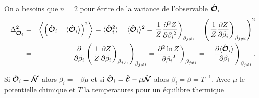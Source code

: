 On a besoins que $n=2$ pour écrire de la variance de l'observable $\hat{\bm{\mathcal{O}}}_i$ 
\begin{eqnarray}
	\Delta_{\hat{\bm{\mathcal{O}}}_i}^2 &=&  	\left \langle \left (\hat{\bm{\mathcal{O}}}_i - \langle\hat{\bm{\mathcal{O}}}_i \rangle \right )^2  \right \rangle  = 	\langle\hat{\bm{\mathcal{O}}}_i^2 \rangle  -  \langle\hat{\bm{\mathcal{O}}}_i \rangle^2 = \left . \frac{1}{Z} \frac{ \partial^2 Z }{ {\partial \beta_i}^2 }  \right )_{\beta_{j\neq i}} - \left ( \left . \frac{1}{Z}\frac{ \partial Z }{ \partial \beta_i }  \right )_{\beta_{j\neq i}}\right )^2  \\
		& = & \frac{\partial}{\partial \beta_i } \left ( \left . \frac{1}{Z} \frac{\partial Z}{\partial \beta_i }  \right )_{\beta_{j\neq i}}  \right )_{\beta_{j\neq i}} =  \left . \frac{\partial^2 \ln Z  }{{\partial \beta_i}^2 }  \right )_{\beta_{j\neq i}}  = - \left . 	\frac{\partial \langle\hat{\bm{\mathcal{O}}}_i \rangle }{\partial \beta_i } \right )_{\beta_{j\neq i}}	.	
\end{eqnarray}

Si $\hat{\bm{\mathcal{O}}}_i = \hat{\bm{\mathcal{N}}}$ alors $\beta_i = - \beta \mu $ et si $\hat{\bm{\mathcal{O}}}_i = \hat{\bm{\mathcal{E}}} - \mu \hat{\bm{\mathcal{N}}} $ alors $\beta_i = \beta = T^{-1}$. Avec $\mu$ le potentielle chimique et $T$ la temperatures pour un équilibre thermique\\
	

	
	
	

